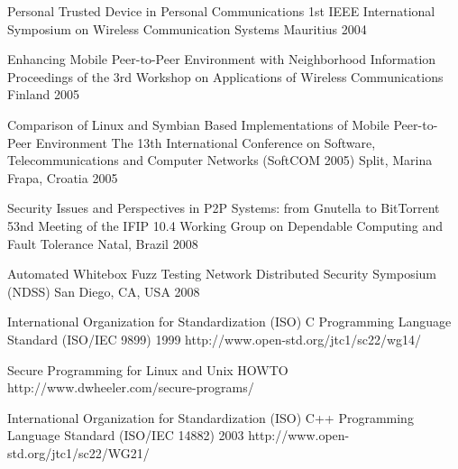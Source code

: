 \begin{thebibliography}{9}
		{
			\biband
			\biband
			\biband
			\biband
			\biband
			\biband
			}
		{Personal Trusted Device in Personal Communications}
		{1st {IEEE} International Symposium on Wireless Communication Systems}
		{Mauritius}
		{2004}
	
		{
			\biband
			}
		{Enhancing Mobile Peer-to-Peer Environment with Neighborhood Information}
		{Proceedings of the 3rd Workshop on Applications of Wireless Communications}
		{Finland}
		{2005}
	
		{
			\biband
			\biband
			}
		{Comparison of {L}inux and {S}ymbian Based Implementations of Mobile Peer-to-Peer Environment}
		{The 13th International Conference on Software, Telecommunications and Computer Networks ({SoftCOM} 2005)}
		{Split, Marina Frapa, Croatia}
		{2005}
	
		{}
		{Security Issues and Perspectives in P2P Systems: from Gnutella to BitTorrent}
		{53nd Meeting of the IFIP 10.4 Working Group on Dependable Computing and Fault Tolerance}
		{Natal, Brazil}
		{2008}
	
		{
			\biband
			\biband
			}
		{Automated Whitebox Fuzz Testing}
		{Network Distributed Security Symposium ({NDSS})}
		{San Diego, CA, USA}
		{2008}


		{International Organization for Standardization (ISO)}
		{{C} Programming Language Standard ({ISO/IEC} 9899)}
		{1999}
		{http://www.open-std.org/jtc1/sc22/wg14/}
		
		{}
		{Secure Programming for {L}inux and {U}nix {HOWTO}}
		{}
		{http://www.dwheeler.com/secure-programs/}
		
		{International Organization for Standardization (ISO)}
		{{C++} Programming Language Standard ({ISO/IEC} 14882)}
		{2003}
		{http://www.open-std.org/jtc1/sc22/WG21/}
		

\end{thebibliography}
